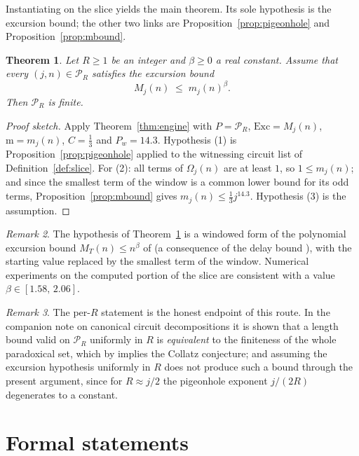 \documentclass[11pt]{amsart}
\theoremstyle{plain}
\newtheorem{theorem}{Theorem}[section]
\theoremstyle{definition}
\theoremstyle{remark}
\newtheorem{remark}[theorem]{Remark}
\newcommand{\Par}{\mathcal{P}}        %
\newcommand{\ParR}[1]{\Par_{#1}}      %
\begin{document}
Instantiating on the slice yields the main theorem.  Its sole hypothesis is
the excursion bound; the other two links are
Proposition~\ref{prop:pigeonhole} and Proposition~\ref{prop:mbound}.

\begin{theorem}\label{thm:main}
Let $R\ge 1$ be an integer and $\beta\ge 0$ a real constant.  Assume that
every $(j,n)\in\ParR{R}$ satisfies the excursion bound
\[
M_j(n) \;\le\; m_j(n)^{\beta}.
\]
Then $\ParR{R}$ is finite.
\end{theorem}

\begin{proof}[Proof sketch]
Apply Theorem~\ref{thm:engine} with $P=\ParR{R}$,
$\mathrm{Exc}=M_j(n)$, $\mathrm{m}=m_j(n)$, $C=\tfrac13$ and $P_w=14.3$.
Hypothesis (1) is Proposition~\ref{prop:pigeonhole} applied to the
witnessing circuit list of Definition~\ref{def:slice}.  For (2): all terms
of $\Omega_j(n)$ are at least $1$, so $1\le m_j(n)$; and since the smallest
term of the window is a common lower bound for its odd terms,
Proposition~\ref{prop:mbound} gives $m_j(n)\le\tfrac13 j^{14.3}$.
Hypothesis (3) is the assumption.
\end{proof}

\begin{remark}\label{rem:hexc}
The hypothesis of Theorem~\ref{thm:main} is a windowed form of the
polynomial excursion bound $M_T(n)\le n^{\beta}$ of \cite[eq.~(16)]{Roz25}
(a consequence of the delay bound \cite[Conj.~6.2]{Roz25}), with the
starting value replaced by the smallest term of the window.  Numerical
experiments on the computed portion of the slice are consistent with a
value $\beta\in[1.58,\,2.06]$.
\end{remark}

\begin{remark}\label{rem:uniform}
The per-$R$ statement is the honest endpoint of this route.  In the
companion note on canonical circuit decompositions it is shown that a
length bound valid on $\ParR{R}$ uniformly in $R$ is \emph{equivalent} to
the finiteness of the whole paradoxical set, which by
\cite[Cor.~3.3]{Roz25} implies the Collatz conjecture; and assuming the
excursion hypothesis uniformly in $R$ does not produce such a bound through
the present argument, since for $R\approx j/2$ the pigeonhole exponent
$j/(2R)$ degenerates to a constant.
\end{remark}

\appendix

\section{Formal statements}\label{app:lean}
\end{document}
